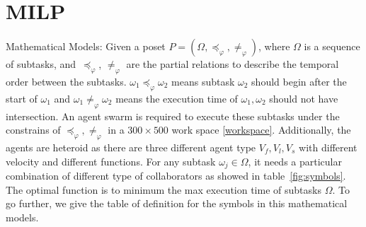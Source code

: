 \section{MILP}

Mathematical Models: Given a poset $P=(\Omega,\preceq_{\varphi},\neq_{\varphi})$, where $\Omega$ is a sequence of 
subtasks, and~$\preceq_{\varphi}$, $\neq_{\varphi}$ are the partial relations to describe the temporal order 
between the subtasks.
 $\omega_1\preceq_{\varphi}\omega_2$ means subtask $\omega_2$ should begin after the start of 
 $\omega_1$ and $\omega_1\neq_{\varphi}\omega_2$ means the execution time of $\omega_1,\omega_2$ should not have
 intersection. 
An agent swarm is required to execute these subtasks under the constrains of 
$\preceq_{\varphi},\neq_{\varphi}$ in a $300\times500$ work space \ref{workspace}. 
Additionally, the agents are heteroid as there are three different agent type $V_f,V_l,V_s$
with different velocity and different functions. 
For any subtask $\omega_j\in\Omega$, it needs a particular combination of 
different type of collaborators as showed in table~\ref{fig:symbols}.
The optimal function is to minimum the max execution time of subtasks $\Omega$.
To go further, we give the table of definition for the symbols in this mathematical models.
